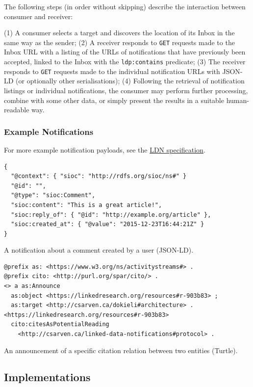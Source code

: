 \documentclass[]{article}
\begin{document}
The following steps (in order without skipping) describe the interaction
between consumer and receiver:

(1) A consumer selects a target and discovers the location of its Inbox
in the same way as the sender; (2) A receiver responds to \texttt{GET}
requests made to the Inbox URL with a listing of the URLs of
notifications that have previously been accepted, linked to the Inbox
with the \texttt{ldp:contains} predicate; {(3) The receiver responds to
\texttt{GET} requests made to the individual notification URLs with
JSON-LD (or optionally other serialisations);} {(4) Following the
retrieval of notification listings or individual notifications, the
consumer may perform further processing, combine with some other data,
or simply present the results in a suitable human-readable way.}

\hypertarget{example-notifications}{}
\subsubsection{Example Notifications}\label{example-notifications}

For more example notification payloads, see the
\href{https://www.w3.org/TR/ldn/}{LDN specification}.

\begin{verbatim}
{
  "@context": { "sioc": "http://rdfs.org/sioc/ns#" }
  "@id": "",
  "@type": "sioc:Comment",
  "sioc:content": "This is a great article!",
  "sioc:reply_of": { "@id": "http://example.org/article" },
  "sioc:created_at": { "@value": "2015-12-23T16:44:21Z" }
}
\end{verbatim}

A notification about a comment created by a user (JSON-LD).

\begin{verbatim}
@prefix as: <https://www.w3.org/ns/activitystreams#> .
@prefix cito: <http://purl.org/spar/cito/> .
<> a as:Announce
  as:object <https://linkedresearch.org/resources#r-903b83> ;
  as:target <http://csarven.ca/dokieli#architecture> .
<https://linkedresearch.org/resources#r-903b83>
  cito:citesAsPotentialReading
    <http://csarven.ca/linked-data-notifications#protocol> .
\end{verbatim}

An announcement of a specific citation relation between two entities
(Turtle).

\hypertarget{implementations}{}
\hypertarget{implementations}{\subsection{Implementations}\label{implementations}}
\end{document}
